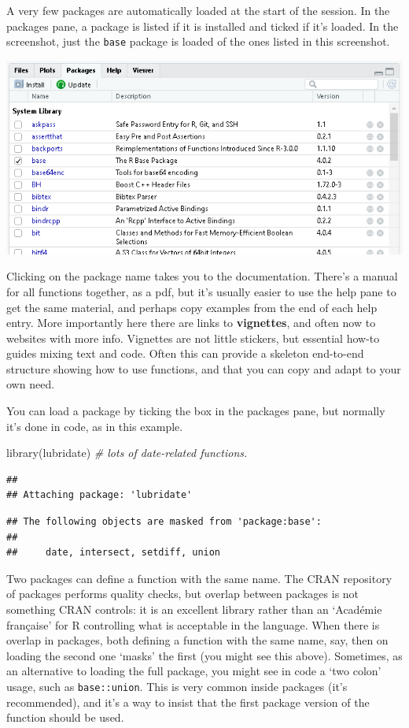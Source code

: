\documentclass[
]{book}
\newenvironment{Shaded}{\begin{snugshade}}{\end{snugshade}}
\newcommand{\CommentTok}[1]{\textcolor[rgb]{0.56,0.35,0.01}{\textit{#1}}}
\newcommand{\FunctionTok}[1]{\textcolor[rgb]{0.00,0.00,0.00}{#1}}
\newcommand{\NormalTok}[1]{#1}
\begin{document}
A very few packages are automatically loaded at the start of the session. In the packages pane, a package is listed if it is installed and ticked if it's loaded. In the screenshot, just the \texttt{base} package is loaded of the ones listed in this screenshot.

\includegraphics{images/packages.png}

Clicking on the package name takes you to the documentation. There's a manual for all functions together, as a pdf, but it's usually easier to use the help pane to get the same material, and perhaps copy examples from the end of each help entry. More importantly here there are links to \textbf{vignettes}, and often now to websites with more info. Vignettes are not little stickers, but essential how-to guides mixing text and code. Often this can provide a skeleton end-to-end structure showing how to use functions, and that you can copy and adapt to your own need.

You can load a package by ticking the box in the packages pane, but normally it's done in code, as in this example.

\begin{Shaded}
\begin{Highlighting}[]
\FunctionTok{library}\NormalTok{(lubridate) }\CommentTok{\# lots of date{-}related functions.}
\end{Highlighting}
\end{Shaded}

\begin{verbatim}
## 
## Attaching package: 'lubridate'
\end{verbatim}

\begin{verbatim}
## The following objects are masked from 'package:base':
## 
##     date, intersect, setdiff, union
\end{verbatim}

Two packages can define a function with the same name. The CRAN repository of packages performs quality checks, but overlap between packages is not something CRAN controls: it is an excellent library rather than an `Académie française' for R controlling what is acceptable in the language. When there is overlap in packages, both defining a function with the same name, say, then on loading the second one `masks' the first (you might see this above). Sometimes, as an alternative to loading the full package, you might see in code a `two colon' usage, such as \texttt{base::union}. This is very common inside packages (it's recommended), and it's a way to insist that the first package version of the function should be used.
\end{document}
